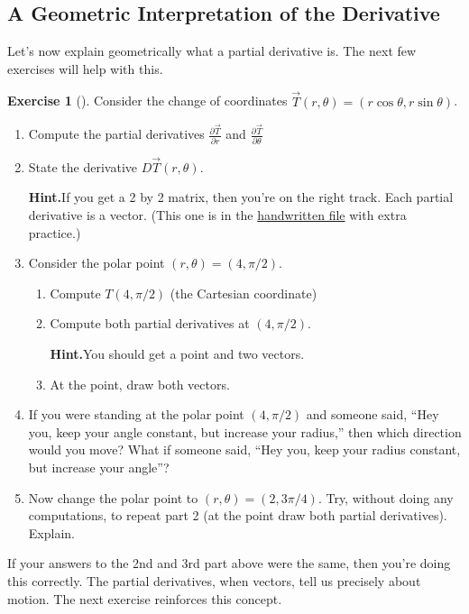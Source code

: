 \documentclass[10pt,]{book}
\theoremstyle{plain}
\theoremstyle{definition}
\theoremstyle{definition}
\theoremstyle{definition}
\theoremstyle{definition}
\newtheorem{exploration}[project]{Exercise}
\theoremstyle{definition}
\numberwithin{equation}{section}
\newcommand{\ds}{\displaystyle}
\begin{document}
\subsection[{A Geometric Interpretation of the Derivative}]{A Geometric Interpretation of the Derivative}\label{subsection-31}
Let's now explain geometrically what a partial derivative is. The next few exercises will help with this.%
\begin{exploration}[]\label{exploration-139}
Consider the change of coordinates \(\vec T(r,\theta) = (r\cos \theta, r\sin \theta)\).%
\begin{enumerate}[font=\bfseries,label=(\alph*),ref=\alph*]
\item\label{task-290} Compute the partial derivatives \(\ds\frac{\partial \vec T}{\partial r}\) and \(\ds\frac{\partial \vec T}{\partial \theta}\)%
\item\label{task-291} State the derivative \(D\vec T(r,\theta)\).%
\par\medskip\noindent%
\textbf{Hint.}\quad If you get a 2 by 2 matrix, then you're on the right track. Each partial derivative is a vector. (This one is in the \href{https://drive.google.com/file/d/0B6Maw2KW9k9aYlBnN0p4Z3MyREk/view?usp=sharing}{handwritten file} with extra practice.)%
\item\label{task-292} Consider the polar point \((r,\theta) = (4,\pi/2)\).%
\begin{enumerate}[font=\bfseries,label=(\roman*),ref=\theenumi.\roman*]
\item\label{task-293} Compute \(T(4,\pi/2)\) (the Cartesian coordinate)%
\item\label{task-294} Compute both partial derivatives at \((4,\pi/2)\).%
\par\medskip\noindent%
\textbf{Hint.}\quad You should get a point and two vectors.%
\item\label{task-295} At the point, draw both vectors.%
\end{enumerate}
\item\label{task-296} If you were standing at the polar point \((4,\pi/2)\) and someone said, ``Hey you, keep your angle constant, but increase your radius,'' then which direction would you move?  What if someone said, ``Hey you, keep your radius constant, but increase your angle''?%
\item\label{task-297} Now change the polar point to \((r,\theta) = (2,3\pi/4)\).  Try, without doing  any computations, to repeat part 2 (at the point draw both partial derivatives). Explain.%
\end{enumerate}
\end{exploration}
If your answers to the 2nd and 3rd part above were the same, then you're doing this correctly. The partial derivatives, when vectors, tell us precisely about motion. The next exercise reinforces this concept.%
\typeout{************************************************}
\typeout{************************************************}
\end{document}
